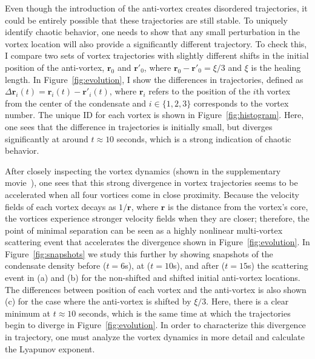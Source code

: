 Even though the introduction of the anti-vortex creates disordered trajectories, it could be entirely possible that these trajectories are still stable.
To uniquely identify chaotic behavior, one needs to show that any small perturbation in the vortex location will also provide a significantly different trajectory.
To check this, I compare two sets of vortex trajectories with slightly different shifts in the initial position of the anti-vortex, $\mathbf{r}_0$ and $\mathbf{r}'_0$, where $\mathbf{r}_0 - \mathbf{r}'_0 = \xi/3$ and $\xi$ is the healing length.
In Figure~\ref{fig:evolution}, I show the differences in trajectories, defined as $\Delta \mathbf{r}_i(t) = \mathbf{r}_{i}(t)-\mathbf{r}'_{i}(t)$, where $\mathbf{r}_i$ refers to the position of the $i$th vortex from the center of the condensate and $i\in \{1,2,3\}$ corresponds to the vortex number.
The unique ID for each vortex is shown in Figure~\ref{fig:histogram}.
Here, one sees that the difference in trajectories is initially small, but diverges significantly at around $t \approx 10$ seconds, which is a strong indication of chaotic behavior.

After closely inspecting the vortex dynamics (shown in the supplementary movie~\cite{movie}), one sees that this strong divergence in vortex trajectories seems to be accelerated when all four vortices come in close proximity.
Because the velocity fields of each vortex decays as $1/\mathbf{r}$, where $\mathbf{r}$ is the distance from the vortex's core, the vortices experience stronger velocity fields when they are closer; therefore, the point of minimal separation can be seen as a highly nonlinear multi-vortex scattering event that accelerates the divergence shown in Figure~\ref{fig:evolution}.
In Figure~\ref{fig:snapshots} we study this further by showing snapshots of the condensate density before ($t = 6$s), at ($t = 10$s), and after ($t = 15$s) the scattering event in (a) and (b) for the non-shifted and shifted initial anti-vortex locations.
The differences between position of each vortex and the anti-vortex is also shown (c) for the case where the anti-vortex is shifted by $\xi/3$.
Here, there is a clear minimum at $t \approx 10$ seconds, which is the same time at which the  trajectories begin to diverge in Figure~\ref{fig:evolution}.
In order to characterize this divergence in trajectory, one must analyze the vortex dynamics in more detail and calculate the Lyapunov exponent.


